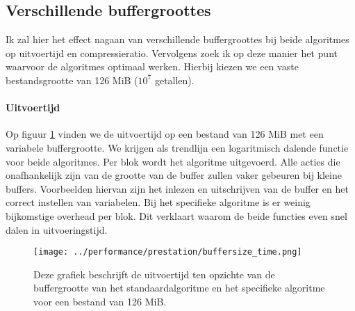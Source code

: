 \documentclass[11pt, a4paper]{article}
\begin{document}
\subsection{Verschillende buffergroottes}
Ik zal hier het effect nagaan van verschillende buffergroottes bij beide algoritmes op uitvoertijd en compressieratio. Vervolgens zoek ik op deze manier het punt waarvoor de algoritmes optimaal werken. Hierbij kiezen we een vaste bestandsgrootte van 126 MiB ($10^7$ getallen).

\paragraph{Uitvoertijd}
Op figuur \ref{fig:buffersize_time} vinden we de uitvoertijd op een bestand van 126 MiB met een variabele buffergrootte. We krijgen als trendlijn een logaritmisch dalende functie voor beide algoritmes.  Per blok wordt het algoritme uitgevoerd. Alle acties  die onafhankelijk zijn van de grootte van de buffer zullen vaker gebeuren bij kleine buffers. Voorbeelden hiervan zijn het inlezen en uitschrijven van de buffer en het correct instellen van variabelen. Bij het specifieke algoritme is er weinig bijkomstige overhead per blok. Dit verklaart waarom de beide functies even snel dalen in uitvoeringstijd. 

\begin{figure}
	\begin{center}
		\texttt{[image: ../performance/prestation/buffersize\_time.png]}
	\end{center}
	\caption{Deze grafiek beschrijft de uitvoertijd ten opzichte van de buffergrootte van het standaardalgoritme en het specifieke algoritme voor een bestand van 126 MiB.}
	\label{fig:buffersize_time}
\end{figure}
\end{document}
